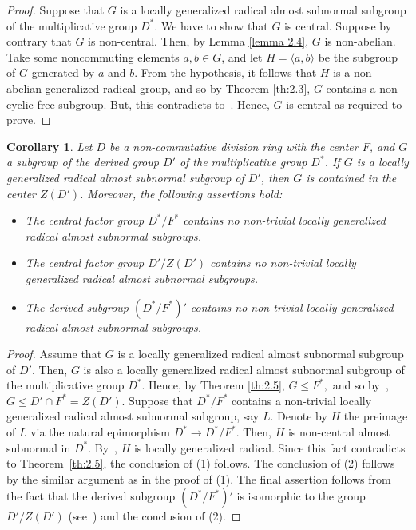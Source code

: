 \documentclass{amsart}
\newtheorem{corollary}[theorem]{Corollary}
\theoremstyle{definition}
\begin{document}
\begin{proof} Suppose that $G$ is a locally generalized radical almost subnormal subgroup of the multiplicative group $D^*.$ We have to show that $G$ is central. Suppose by contrary that $G$ is non-central. Then, by Lemma \ref{lemma 2.4}, $G$ is non-abelian. Take some noncommuting elements $a, b\in G$, and let $H=\langle a, b\rangle$ be the subgroup of $G$ generated by $a$ and $b$. From the hypothesis, it follows that $H$ is a non-abelian generalized radical group, and so by Theorem \ref{th:2.3}, $G$ contains a non-cyclic free subgroup. But, this contradicts to~\cite[Theorem 2.4]{Pa_ChuaHai_2026}. Hence, $G$ is central as required to prove. 
\end{proof}
\begin{corollary}\label{cor:2.6}	
Let $D$ be a non-commutative division ring with the center $F$, and $G$ a subgroup of the derived group $D'$ of the multiplicative group $D^*$. If $G$ is a locally generalized radical almost subnormal subgroup of $D'$, then $G$ is contained in the center $Z(D')$. Moreover,  the following assertions hold:
   \begin{itemize}
	  \item [(1)] The central factor group $D^*/F^*$ contains no non-trivial locally generalized radical almost subnormal subgroups.
	  \item [(2)] The central factor group $D'/Z(D')$ contains no non-trivial locally generalized radical almost subnormal subgroups.
	  \item [(3)] The derived subgroup $(D^*/F^*)'$ contains no non-trivial locally generalized radical almost subnormal subgroups.
    \end{itemize}
\end{corollary}
\begin{proof} Assume that $G$ is a locally generalized radical almost subnormal subgroup of $D'$. Then, $G$ is also a locally generalized radical almost subnormal subgroup of the multiplicative group $D^*$. Hence, by Theorem \ref{th:2.5}, $G\le F^*,$ and so by~\cite[Lemma~ 3.1]{Pa_ChuaHai_2026}, $G\leq D'\cap F^*=Z(D')$. Suppose that $D^*/F^*$ contains a non-trivial locally generalized radical almost subnormal subgroup, say $L$. Denote by $H$ the preimage of $L$ via the natural epimorphism $D^*\longrightarrow D^*/F^*$.  Then, $H$ is non-central almost subnormal in $D^*.$ By~\cite[Lemma 2.1]{Pa_ChuaHai_2026}, $H$ is locally generalized radical. Since this fact contradicts to Theorem~\ref{th:2.5}, the conclusion of (1) follows. The conclusion of (2) follows by the similar argument as in the proof of (1). The final assertion follows from the fact that the derived subgroup $(D^*/F^*)'$ is isomorphic to the group $D'/Z(D')$ (see~\cite[Lemma 3.1]{Pa_ChuaHai_2026}) and the conclusion of (2). 
\end{proof}
\end{document}

